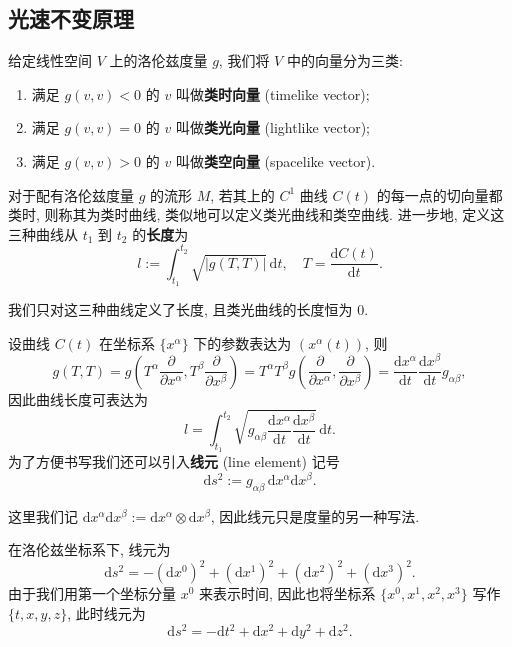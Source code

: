 \subsection{光速不变原理}
\label{line element}
\begin{definition}
    给定线性空间 $ V $ 上的洛伦兹度量 $ g $, 我们将 $ V $ 中的向量分为三类:
    \begin{enumerate}
        \item 满足 $ g(v,v)<0 $ 的 $ v $ 叫做{\bf 类时向量} (timelike vector);
        \item 满足 $ g(v,v)=0 $ 的 $ v $ 叫做{\bf 类光向量} (lightlike vector);
        \item 满足 $ g(v,v)>0 $ 的 $ v $ 叫做{\bf 类空向量} (spacelike vector).
    \end{enumerate}
\end{definition}

\begin{definition}[曲线长度]
    对于配有洛伦兹度量 $ g $ 的流形 $ M $, 若其上的 $ C^1 $ 曲线 $ C(t) $ 的每一点的切向量都类时, 则称其为类时曲线, 类似地可以定义类光曲线和类空曲线. 进一步地, 定义这三种曲线从 $ t_1 $ 到 $ t_2 $ 的{\bf 长度}为
    \[ l:=\int_{t_1}^{t_2}\sqrt{|g(T,T)|}\,\mathrm{d}t,\quad T=\frac{\mathrm{d} C(t)}{\mathrm{d} t}. \]
\end{definition}

\begin{remark}
    我们只对这三种曲线定义了长度, 且类光曲线的长度恒为 $ 0 $.
\end{remark}
设曲线 $C(t)$ 在坐标系 $\{x^\alpha\}$ 下的参数表达为 $(x^\alpha(t))$, 则
\[ g(T,T)=g\left( T^\alpha\frac{\partial}{\partial x^\alpha},T^\beta\frac{\partial}{\partial x^\beta} \right)=T^\alpha T^\beta g\left( \frac{\partial}{\partial x^\alpha},\frac{\partial}{\partial x^\beta} \right)=\frac{\mathrm{d}x^\alpha}{\mathrm{d}t}\frac{\mathrm{d}x^\beta}{\mathrm{d}t}g_{\alpha\beta}, \]
因此曲线长度可表达为
\[ l=\int_{t_1}^{t_2}\sqrt{g_{\alpha\beta}\frac{\mathrm{d} x^\alpha}{\mathrm{d} t}\frac{\mathrm{d} x^\beta}{\mathrm{d} t}}\,\mathrm{d} t. \] 
为了方便书写我们还可以引入{\bf 线元} (line element) 记号 
\[ \mathrm{d}s^2:=g_{\alpha\beta}\,\mathrm{d}x^\alpha\mathrm{d}x^\beta. \] 
\begin{remark}
    这里我们记 $\mathrm{d}x^{\alpha}\mathrm{d}x^{\beta}:=\mathrm{d}x^{\alpha}\otimes\mathrm{d}x^{\beta}$, 因此线元只是度量的另一种写法. 
\end{remark}

在洛伦兹坐标系下, 线元为
\[ \mathrm{d}s^2=-(\mathrm{d}x^0)^2+(\mathrm{d}x^1)^2+(\mathrm{d}x^2)^2+(\mathrm{d}x^3)^2. \]
由于我们用第一个坐标分量 $ x^0 $ 来表示时间, 因此也将坐标系 $ \{x^0,x^1,x^2,x^3\} $ 写作 $ \{t,x,y,z\} $, 此时线元为
\[ \mathrm{d}s^2=-\mathrm{d}t^2+\mathrm{d}x^2+\mathrm{d}y^2+\mathrm{d}z^2. \]


